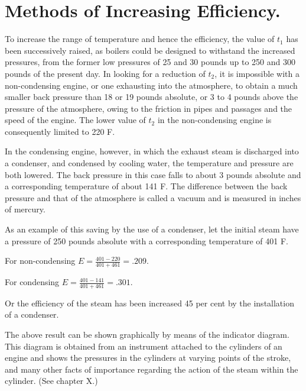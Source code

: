 \documentclass[11pt, a5paper]{book}
\begin{document}
\section{Methods of Increasing Efficiency.}To increase the range of
temperature and hence the efficiency, the value of $t_1$ has been
successively raised, as boilers could be designed to withstand the
increased pressures, from the former low pressures of 25 and 30 pounds
up to 250 and 300 pounds of the present day.  In looking for a
reduction of $t_2$, it is impossible with a non-condensing engine, or
one exhausting into the atmosphere, to obtain a much smaller back
pressure than 18 or 19 pounds absolute, or 3 to 4 pounds above the
pressure of the atmosphere, owing to the friction in pipes and
passages and the speed of the engine.  The lower value of $t_2$ in the
non-condensing engine is consequently limited to 220\degree{} F.\par

In the condensing engine, however, in which the exhaust steam is
discharged into a condenser, and condensed by cooling water, the
temperature and pressure are both lowered.  The back pressure in this
case falls to about 3 pounds absolute and a corresponding temperature
of about 141\degree{} F.  The difference between the back pressure and
that of the atmosphere is called a vacuum and is measured in inches of
mercury.\par

As an example of this saving by the use of a condenser, let the
initial steam have a pressure of 250 pounds absolute with a
corresponding temperature of 401\degree{} F.\par

For non-condensing $E = \frac{401-220}{401+461}=.209$.\par\label{cond_non-cond}

For condensing $E=\frac{401-141}{401+461}=.301$.\par

Or the efficiency of the steam has been increased 45 per cent by the
installation of a condenser.\par

The above result can be shown graphically by means of the indicator
diagram.  This diagram is obtained from an instrument attached to the
cylinders of an engine and shows the pressures in the cylinders at
varying points of the stroke, and many other facts of importance
regarding the action of the steam within the cylinder. (See chapter
X.)\par
\end{document}
